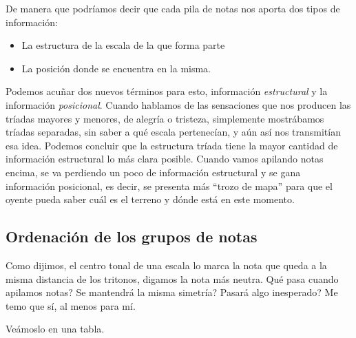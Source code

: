 \documentclass[]{report}
\providecommand{\tightlist}{%
  \setlength{
\itemsep}{0pt}\setlength{\parskip}{0pt}}
\begin{document}
  De manera que podríamos decir que cada pila de notas nos aporta dos tipos de información:
  
  \begin{itemize}   
    \tightlist
    \item La estructura de la escala de la que forma parte
    \item La posición donde se encuentra en la misma.
  \end{itemize}
  
  Podemos acuñar dos nuevos términos para esto, información \emph{estructural} y la información \emph{posicional}. Cuando hablamos de las sensaciones que nos producen las tríadas mayores y menores, de alegría o tristeza, simplemente mostrábamos tríadas separadas, sin saber a qué escala pertenecían, y aún así nos transmitían esa idea. Podemos concluir que la estructura tríada tiene la mayor cantidad de información estructural lo más clara posible. Cuando vamos apilando notas encima, se va perdiendo un poco de información estructural y se gana información posicional, es decir, se presenta más ``trozo de mapa'' para que el oyente pueda saber cuál es el terreno y dónde está en este momento.
  
  \subsection{Ordenación de los grupos de notas}
  
  Como dijimos, el centro tonal de una escala lo marca la nota que queda a la misma distancia de los tritonos, digamos la nota más neutra. Qué pasa cuando apilamos notas? Se mantendrá la misma simetría? Pasará algo inesperado? Me temo que sí, al menos para mí.
  
  Veámoslo en una tabla.
  
  
\end{document}

